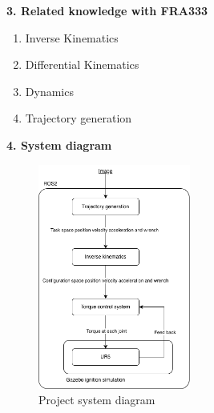 \documentclass[10pt]{article}
\begin{document}
\large
\noindent
\textbf{3. Related knowledge with FRA333} \\
\normalsize
\begin{enumerate}[nosep, itemsep=-2pt]
    \item Inverse Kinematics
    \item Differential Kinematics
    \item Dynamics
    \item Trajectory generation
\end{enumerate}

\large
\noindent
\textbf{4. System diagram} \\
\normalsize
\indent
\begin{figure}[h]
    \centering
    \includegraphics[width=5cm,keepaspectratio]{img/system_diagram.png}
    \caption{Project system diagram}
    \label{fig:system diagram} 
\end{figure}
\vspace*{-0.5\baselineskip} 
\end{document}
